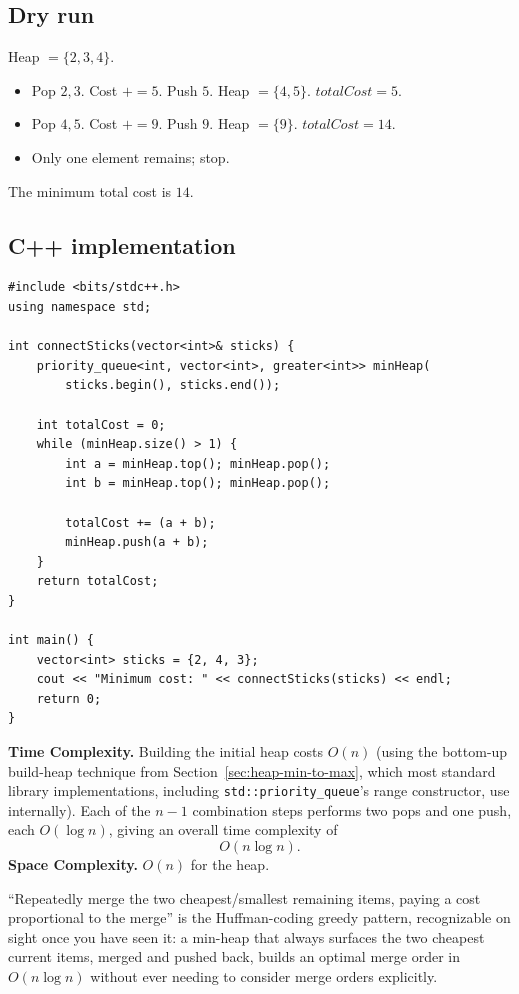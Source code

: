 \subsection*{Dry run}


Heap $=\{2,3,4\}$.

\begin{itemize}
  \item Pop $2,3$. Cost $+=5$. Push $5$. Heap $=\{4,5\}$.
        $\textit{totalCost}=5$.
  \item Pop $4,5$. Cost $+=9$. Push $9$. Heap $=\{9\}$.
        $\textit{totalCost}=14$.
  \item Only one element remains; stop.
\end{itemize}

The minimum total cost is $14$.

\subsection*{C++ implementation}

\begin{lstlisting}
#include <bits/stdc++.h>
using namespace std;

int connectSticks(vector<int>& sticks) {
    priority_queue<int, vector<int>, greater<int>> minHeap(
        sticks.begin(), sticks.end());

    int totalCost = 0;
    while (minHeap.size() > 1) {
        int a = minHeap.top(); minHeap.pop();
        int b = minHeap.top(); minHeap.pop();

        totalCost += (a + b);
        minHeap.push(a + b);
    }
    return totalCost;
}

int main() {
    vector<int> sticks = {2, 4, 3};
    cout << "Minimum cost: " << connectSticks(sticks) << endl;
    return 0;
}
\end{lstlisting}

\begin{complexitybox}
\textbf{Time Complexity.} Building the initial heap costs $O(n)$ (using
the bottom-up build-heap technique from
Section~\ref{sec:heap-min-to-max}, which most standard library
implementations, including \texttt{std::priority\_queue}'s range
constructor, use internally). Each of the $n-1$ combination steps performs
two pops and one push, each $O(\log n)$, giving an overall time complexity
of
\[
  O(n \log n).
\]
\textbf{Space Complexity.} $O(n)$ for the heap.
\end{complexitybox}

\begin{takeawaybox}
``Repeatedly merge the two cheapest/smallest remaining items, paying a
cost proportional to the merge'' is the Huffman-coding greedy pattern,
recognizable on sight once you have seen it: a min-heap that always
surfaces the two cheapest current items, merged and pushed back, builds an
optimal merge order in $O(n \log n)$ without ever needing to consider
merge orders explicitly.
\end{takeawaybox}
